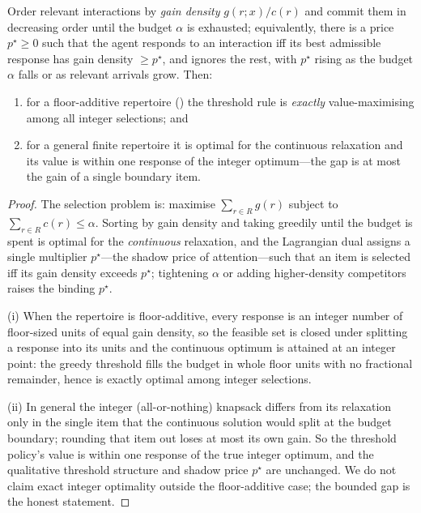 \documentclass[11pt,twocolumn,a4paper]{article}
\newcommand{\resp}{r}                %
\newcommand{\att}{\alpha}            %
\newcommand{\cost}{c}                %
\newcommand{\gain}{g}                %
\begin{document}
\begin{theorem}
\label{thm:threshold}
Order relevant interactions by \emph{gain density}
$\gain(\resp;x)/\cost(\resp)$ and commit them in decreasing order until the
budget $\att$ is exhausted; equivalently, there is a price $p^\star\ge0$
such that the agent responds to an interaction iff its best admissible
response has gain density $\ge p^\star$, and ignores the rest, with
$p^\star$ rising as the budget $\att$ falls or as relevant arrivals grow.
Then:
\begin{enumerate}[label=\textup{(\roman*)},leftmargin=2.2em]
\item for a floor-additive repertoire () the threshold
rule is \emph{exactly} value-maximising among all integer selections; and
\item for a general finite repertoire it is optimal for the continuous
relaxation and its value is within one response of the integer optimum---the
gap is at most the gain of a single boundary item.
\end{enumerate}
\end{theorem}

\begin{proof}
The selection problem is: maximise $\sum_{\resp\in R}\gain(\resp)$ subject
to $\sum_{\resp\in R}\cost(\resp)\le\att$. Sorting by gain density and
taking greedily until the budget is spent is optimal for the
\emph{continuous} relaxation, and the Lagrangian dual assigns a single
multiplier $p^\star$---the shadow price of attention---such that an item is
selected iff its gain density exceeds $p^\star$; tightening $\att$ or adding
higher-density competitors raises the binding $p^\star$.

(i) When the repertoire is floor-additive, every response is an integer
number of floor-sized units of equal gain density, so the feasible set is
closed under splitting a response into its units and the continuous optimum
is attained at an integer point: the greedy threshold fills the budget in
whole floor units with no fractional remainder, hence is exactly optimal
among integer selections.

(ii) In general the integer (all-or-nothing) knapsack differs from its
relaxation only in the single item that the continuous solution would split
at the budget boundary; rounding that item out loses at most its own gain.
So the threshold policy's value is within one response of the true integer
optimum, and the qualitative threshold structure and shadow price $p^\star$
are unchanged. We do not claim exact integer optimality outside the
floor-additive case; the bounded gap is the honest statement.
\end{proof}
\end{document}
